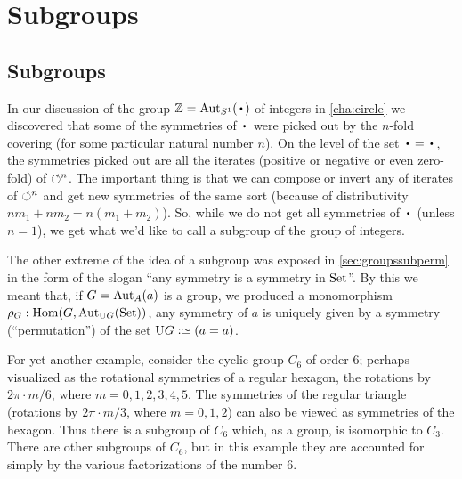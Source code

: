 \chapter{Subgroups}
\label{ch:subgroups}
\section{Subgroups}
\label{sec:subgroups}
In our discussion of the group $\ZZ=\aut_{S^1}(\base)$ of integers in \cref{cha:circle} we discovered that some of the symmetries of $\base$ were picked out by the $n$-fold covering (for some particular natural number $n$).  On the level of the set $\base=\base$, the symmetries picked out are all the iterates (positive or negative or even zero-fold) of $\circlearrowleft^n$.  The important thing is that we can compose or invert any of iterates of $\circlearrowleft^n$ and get new symmetries of the same sort (because of distributivity $nm_1+nm_2=n(m_1+m_2)$).  So, while we do not get all symmetries of $\base$ (unless $n=1$), we get what we'd like to call a subgroup of the group of integers. 



The other extreme of the idea of a subgroup was exposed in \cref{sec:groupssubperm} in the form of the slogan ``any symmetry is a symmetry in $\mathrm{Set}$''.
By this we meant that, if $G=\aut_A(a)$ is a group, we produced a monomorphism $\rho_G:\Hom(G,\aut_{\USym G}(\Set))$, \ie any symmetry of $a$ is uniquely given by a symmetry (``permutation'') of the set $\USym G\defequi (a=a)$.

For yet another example, consider the cyclic group $C_6$ of order $6$; perhaps visualized as the rotational symmetries of a regular hexagon,  \ie the rotations by $2\pi\cdot m /6$, where $m=0,1,2,3,4,5$.
The symmetries of the regular triangle (rotations by $2\pi\cdot m/3$, where $m=0,1,2$) can also be viewed as symmetries of the hexagon.  Thus there is a subgroup of $C_6$ which, as a group, is isomorphic to $C_3$.
There are other subgroups of $C_6$, but in this example they are accounted for simply by the various factorizations of the number $6$.  

